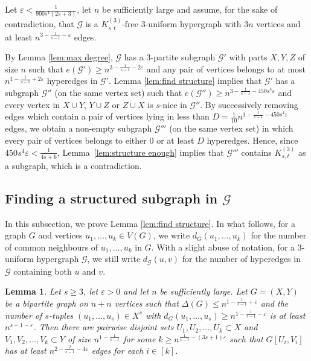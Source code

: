 \documentclass[a4paper,11pt]{article}
\makeatletter
\renewenvironment{proof}[1][\proofname] {\par\pushQED{\qed}\normalfont\topsep6\p@\@plus6\p@\relax\trivlist\item[\hskip\labelsep\bfseries#1\@addpunct{.}]\ignorespaces}{\popQED\endtrivlist\@endpefalse}
\newtheorem{lemma}[theorem]{\bf Lemma}
\theoremstyle{definition}
\def\eps{\varepsilon}
\def\cG{\mathcal{G}}
\makeatother
\begin{document}
\begin{proof}[Proof of Theorem \ref{thm:eps improvement}]
    Let $\eps<\frac{1}{900s^4(2s+3)}$, let $n$ be sufficiently large and assume, for the sake of contradiction, that $\cG$ is a $K_{s,t}^{(3)}$-free $3$-uniform hypergraph with $3n$ vertices and at least $n^{3-\frac{1}{s-1}-\eps}$ edges.
    
    By Lemma \ref{lem:max degree}, $\cG$ has a $3$-partite subgraph $\cG'$ with parts $X,Y,Z$ of size $n$ such that $e(\cG')\geq n^{3-\frac{1}{s-1}-2\eps}$ and any pair of vertices belongs to at most $n^{1-\frac{1}{s-1}+2\eps}$ hyperedges in $\cG'$.
    Lemma \ref{lem:find structure} implies that $\cG'$ has a subgraph $\cG''$ (on the same vertex set) such that $e(\cG'')\geq n^{3-\frac{1}{s-1}-450s^4 \eps}$ and every vertex in $X\cup Y$, $Y\cup Z$ or $Z\cup X$ is $s$-nice in $\cG''$. By successively removing edges which contain a pair of vertices lying in less than $D = \frac{1}{10}n^{1-\frac{1}{s-1}-450s^4 \eps}$ edges, we obtain a non-empty subgraph $\cG'''$ (on the same vertex set) in which every pair of vertices belongs to either $0$ or at least $D$ hyperedges. Hence, since $450s^4 \eps<\frac{1}{4s+6}$, Lemma~\ref{lem:structure enough} implies that $\cG'''$ contains $K_{s,t}^{(3)}$ as a subgraph, which is a contradiction.
\end{proof}

\subsection{Finding a structured subgraph in $\cG$} \label{subsec:structure}

In this subsection, we prove Lemma \ref{lem:find structure}. In what follows, for a graph $G$ and vertices $u_1,\dots,u_k\in V(G)$, we write $d_G(u_1,\dots,u_k)$ for the number of common neighbours of $u_1,\dots,u_k$ in $G$. With a slight abuse of notation, for a $3$-uniform hypergraph $\cG$, we still write $d_{\cG}(u,v)$ for the number of hyperedges in $\cG$ containing both $u$ and $v$.

\begin{lemma} \label{lem:partition}
    Let $s\geq 3$, let $\eps>0$ and let $n$ be sufficiently large. Let $G=(X,Y)$ be a bipartite graph on $n+n$ vertices such that $\Delta(G)\leq n^{1-\frac{1}{s-1}+\eps}$ and the number of $s$-tuples $(u_1,\dots,u_s)\in X^s$ with $d_G(u_1,\dots,u_s)\geq n^{1-\frac{1}{s-1}-\eps}$ is at least $n^{s-1-\eps}$. Then there are pairwise disjoint sets $U_1,U_2,\dots,U_k\subset X$ and $V_1,V_2,\dots,V_k\subset Y$ of size $n^{1-\frac{1}{s-1}}$ for some $k\geq n^{\frac{1}{s-1}-(3s+1)\eps}$ such that $G[U_i,V_i]$ has at least $n^{2-\frac{2}{s-1}-4\eps}$ edges for each $i\in [k]$.
\end{lemma}
\end{document}
